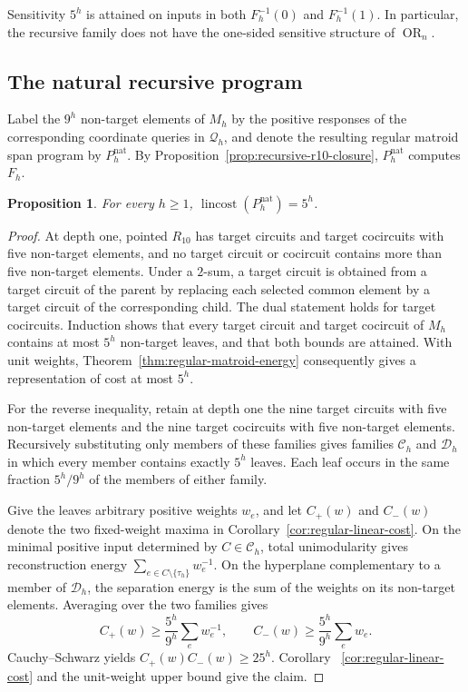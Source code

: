 \documentclass[11pt]{article}
\numberwithin{equation}{section}
\newtheorem{proposition}[definition]{Proposition}
\theoremstyle{remark}
\begin{document}
Sensitivity $5^h$ is attained on inputs in both $F_h^{-1}(0)$ and $F_h^{-1}(1)$.
In particular, the recursive family does not have the one-sided sensitive
structure of $\operatorname{OR}_n$.

\subsection{The natural recursive program}

Label the $9^h$ non-target elements of $M_h$ by the positive responses of the
corresponding coordinate queries in $\mathcal Q_h$, and denote the resulting
regular matroid span program by $P_h^{\mathrm{nat}}$.  By
Proposition~\ref{prop:recursive-r10-closure}, $P_h^{\mathrm{nat}}$ computes
$F_h$.

\begin{proposition}
\label{prop:recursive-r10-natural-cost}
For every $h\geq1$, $\operatorname{lincost}(P_h^{\mathrm{nat}})=5^h$.
\end{proposition}

\begin{proof}
At depth one, pointed $R_{10}$ has target circuits and target cocircuits with
five non-target elements, and no target circuit or cocircuit contains more
than five non-target elements.  Under a $2$-sum, a target circuit is obtained
from a target circuit of the parent by replacing each selected common element
by a target circuit of the corresponding child.  The dual statement holds
for target cocircuits.  Induction shows that every target circuit
and target cocircuit of $M_h$ contains at most $5^h$ non-target leaves, and
that both bounds are attained.  With unit weights,
Theorem~\ref{thm:regular-matroid-energy} consequently gives a representation
of cost at most $5^h$.

For the reverse inequality, retain at depth one the nine target circuits with
five non-target elements and the nine target cocircuits with five non-target
elements.  Recursively substituting only members of these families gives
families $\mathcal C_h$ and $\mathcal D_h$ in which every member contains
exactly $5^h$ leaves.  Each leaf occurs in the same fraction
$5^h/9^h$ of the members of either family.

Give the leaves arbitrary positive weights $w_e$, and let $C_+(w)$ and $C_-(w)$ denote the two fixed-weight maxima in Corollary~\ref{cor:regular-linear-cost}.  On the minimal positive input determined by $C\in\mathcal C_h$, total
unimodularity gives reconstruction energy
$\sum_{e\in C\setminus\{\tau_h\}}w_e^{-1}$. On the hyperplane complementary
to a member of $\mathcal D_h$, the separation energy is the sum of the
weights on its non-target elements. Averaging over the two families gives
\begin{equation}
    C_+(w)\geq\frac{5^h}{9^h}\sum_e w_e^{-1},
    \qquad
    C_-(w)\geq\frac{5^h}{9^h}\sum_e w_e.
\end{equation}
Cauchy--Schwarz yields $C_+(w)C_-(w)\geq25^h$.  Corollary
~\ref{cor:regular-linear-cost} and the unit-weight upper bound give the
claim.
\end{proof}
\end{document}
